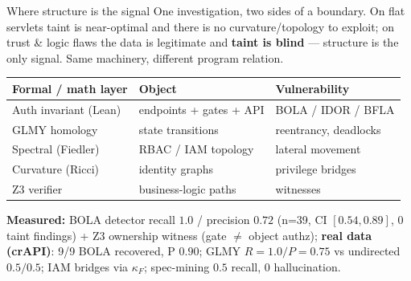 \documentclass[aspectratio=169,11pt]{beamer}
\begin{document}
\begin{frame}{Where structure is the signal}
  One investigation, two sides of a boundary. On flat servlets taint is
  near-optimal and there is no curvature/topology to exploit; on trust \& logic
  flaws the data is legitimate and \textbf{taint is blind} --- structure is the
  only signal. Same machinery, different program relation.
  \begin{center}
  \small
  \begin{tabular}{lll}
  \toprule
  \textbf{Formal / math layer} & \textbf{Object} & \textbf{Vulnerability} \\
  \midrule
  Auth invariant (Lean) & endpoints + gates + API & BOLA / IDOR / BFLA \\
  GLMY homology & state transitions & reentrancy, deadlocks \\
  Spectral (Fiedler) & RBAC / IAM topology & lateral movement \\
  Curvature (Ricci) & identity graphs & privilege bridges \\
  Z3 verifier & business-logic paths & witnesses \\
  \bottomrule
  \end{tabular}
  \end{center}
  \vspace{1mm}
  \textbf{Measured:} BOLA detector recall $1.0$ / precision $0.72$ (n=39, CI
  $[0.54,0.89]$, 0 taint findings) + Z3 ownership witness (gate $\neq$ object
  authz); \textbf{real data (crAPI)}: 9/9 BOLA recovered, P $0.90$; GLMY
  $R{=}1.0/P{=}0.75$ vs undirected $0.5/0.5$; IAM bridges via $\kappa_F$;
  spec-mining $0.5$ recall, $0$ hallucination.
\end{frame}
\end{document}
